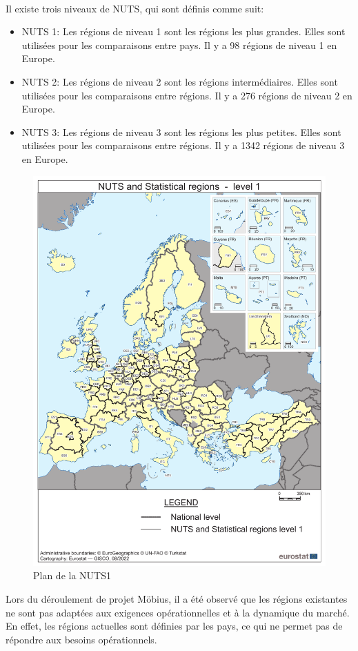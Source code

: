 \paragraph{}
\vspace{-2em}
Il existe trois niveaux de NUTS, qui sont définis comme suit:
\begin{itemize}
    \item NUTS 1: Les régions de niveau 1 sont les régions les plus grandes. Elles sont utilisées pour les comparaisons entre pays. Il y a 98 régions de niveau 1 en Europe.
    \item NUTS 2: Les régions de niveau 2 sont les régions intermédiaires. Elles sont utilisées pour les comparaisons entre régions. Il y a 276 régions de niveau 2 en Europe.
    \item NUTS 3: Les régions de niveau 3 sont les régions les plus petites. Elles sont utilisées pour les comparaisons entre régions. Il y a 1342 régions de niveau 3 en Europe.
\end{itemize}
\begin{figure}[H]
    \centering
    \includegraphics[width=0.5\linewidth]{./Graphismes-UTC/logos/Amazon/NUTS1.pdf}\hfill
    \caption{Plan de la NUTS1\cite{nuts1}}
\end{figure}

Lors du déroulement de projet Möbius, il a été observé que les régions existantes ne sont pas adaptées aux exigences opérationnelles et à la dynamique du marché. En effet, les régions actuelles sont définies par les pays, ce qui ne permet pas de répondre aux besoins opérationnels. 

